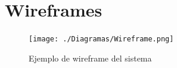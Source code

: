 \documentclass{report}
\begin{document}
\chapter{Wireframes}

\begin{figure}[H]
    \centering
    \texttt{[image: ./Diagramas/Wireframe.png]}
    \caption{Ejemplo de wireframe del sistema}
\end{figure}
\end{document}
